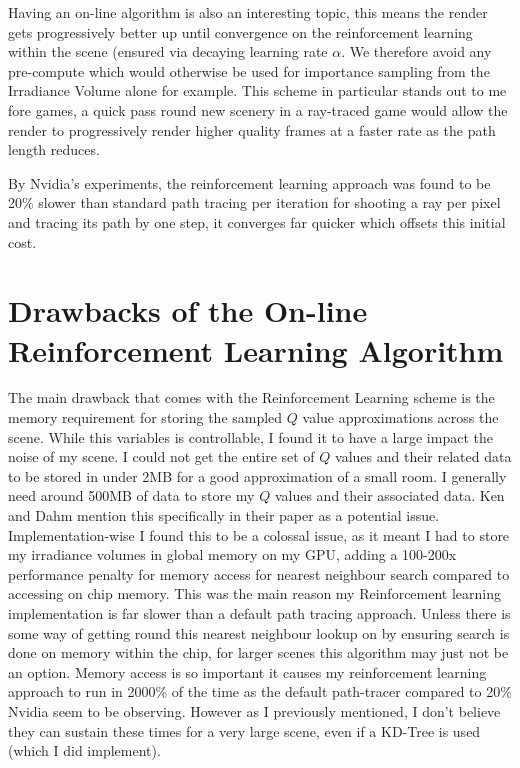 \documentclass[conference]{IEEEtran}
\begin{document}
Having an on-line algorithm is also an interesting topic, this means the render gets progressively better up until convergence on the reinforcement learning within the scene (ensured via decaying learning rate $\alpha$. We therefore avoid any pre-compute which would otherwise be used for importance sampling from the Irradiance Volume alone for example. This scheme in particular stands out to me fore games, a quick pass round new scenery in a ray-traced game would allow the render to progressively render higher quality frames at a faster rate as the path length reduces. 

By Nvidia's experiments, the reinforcement learning approach was found to be 20\% slower than standard path tracing per iteration for shooting a ray per pixel and tracing its path by one step, it converges far quicker which offsets this initial cost.

\section{Drawbacks of the On-line Reinforcement Learning Algorithm}
The main drawback that comes with the Reinforcement Learning scheme is the memory requirement for storing the sampled $Q$ value approximations across the scene. While this variables is controllable, I found it to have a large impact the noise of my scene. I could not get the entire set of $Q$ values and their related data to be stored in under 2MB for a good approximation of a small room. I generally need around 500MB of data to store my $Q$ values and their associated data. Ken and Dahm mention this specifically in their paper as a potential issue. Implementation-wise I found this to be a colossal issue, as it meant I had to store my irradiance volumes in global memory on my GPU, adding a 100-200x performance penalty for memory access for nearest neighbour search compared to accessing on chip memory. This was the main reason my Reinforcement learning implementation is far slower than a default path tracing approach. Unless there is some way of getting round this nearest neighbour lookup on by ensuring search is done on memory within the chip, for larger scenes this algorithm may just not be an option. Memory access is so important it causes my reinforcement learning approach to run in 2000\% of the time as the default path-tracer compared to 20\% Nvidia seem to be observing. However as I previously mentioned, I don't believe they can sustain these times for a very large scene, even if a KD-Tree is used (which I did implement).
\end{document}
